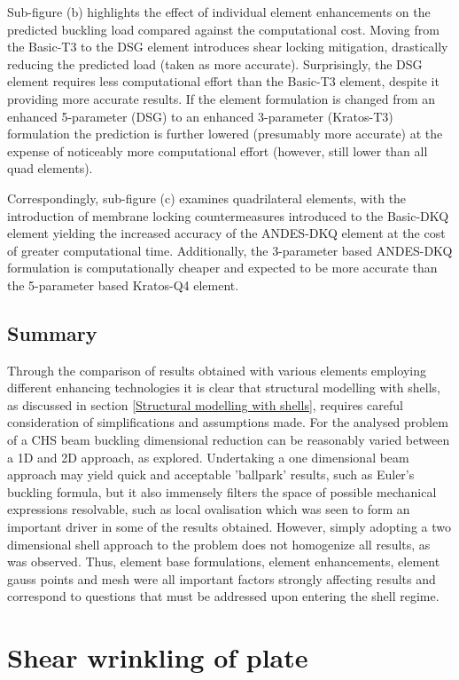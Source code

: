 Sub-figure (b) highlights the effect of individual element enhancements on the predicted buckling load compared against the computational cost. Moving from the Basic-T3 to the DSG element introduces shear locking mitigation, drastically reducing the predicted load (taken as more accurate). Surprisingly, the DSG element requires less computational effort than the Basic-T3 element, despite it providing more accurate results. If the element formulation is changed from an enhanced 5-parameter (DSG) to an enhanced 3-parameter (Kratos-T3) formulation the prediction is further lowered (presumably more accurate) at the expense of noticeably more computational effort (however, still lower than all quad elements).

Correspondingly, sub-figure (c) examines quadrilateral elements, with the introduction of membrane locking countermeasures introduced to the Basic-DKQ element yielding the increased accuracy of the ANDES-DKQ element at the cost of greater computational time. Additionally, the 3-parameter based ANDES-DKQ formulation is computationally cheaper and expected to be more accurate than the 5-parameter based Kratos-Q4 element.

\subsection{Summary}
Through the comparison of results obtained with various elements employing different enhancing technologies it is clear that structural modelling with shells, as discussed in section \ref{Structural modelling with shells}, requires careful consideration of simplifications and assumptions made. For the analysed problem of a CHS beam buckling dimensional reduction can be reasonably varied between a 1D and 2D approach, as explored. Undertaking a one dimensional beam approach may yield quick and acceptable 'ballpark' results, such as Euler's buckling formula, but it also immensely filters the space of possible mechanical expressions resolvable, such as local ovalisation which was seen to form an important driver in some of the results obtained. However, simply adopting a two dimensional shell approach to the problem does not homogenize all results, as was observed. Thus, element base formulations, element enhancements, element gauss points and mesh were all important factors strongly affecting results and correspond to questions that must be addressed upon entering the shell regime. 

\section{Shear wrinkling of plate}

